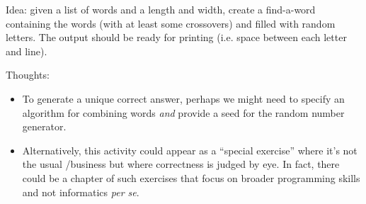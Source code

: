 

Idea: given a list of words and a length and width, create a find-a-word containing the
words (with at least some crossovers) and filled with random letters. The output should be
ready for printing (i.e. space between each letter and line).

Thoughts:
\begin{itemize}
  \item To generate a unique correct answer, perhaps we might need to specify an algorithm
    for combining words \emph{and} provide a seed for the random number generator.
  \item Alternatively, this activity could appear as a ``special exercise'' where it's not
    the usual \IN/\OUT business but where correctness is judged by eye. In fact, there
    could be a chapter of such exercises that focus on broader programming skills and not
    informatics \emph{per se}.
\end{itemize}
